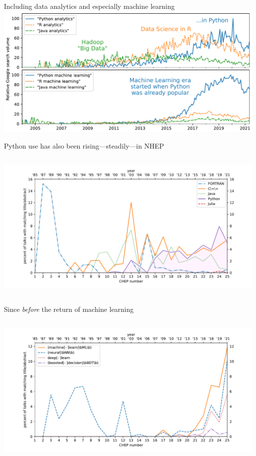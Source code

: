 \documentclass[aspectratio=169]{beamer}
\begin{document}
\begin{frame}{Including data analytics and especially machine learning}
\vspace{0.65 cm}
\includegraphics[width=\linewidth]{PLOTS/analytics-by-language.pdf}
\end{frame}

\begin{frame}{Python use has also been rising---steadily---in NHEP}
\vspace{0.15 cm}
\begin{columns}
\includegraphics[width=\linewidth]{PLOTS/chep-papers-language-2.pdf}
\end{columns}
\end{frame}

\begin{frame}{Since {\it before} the return of machine learning}
\vspace{0.15 cm}
\begin{columns}
\includegraphics[width=\linewidth]{PLOTS/chep-papers-ml.pdf}
\end{columns}
\end{frame}
\end{document}
